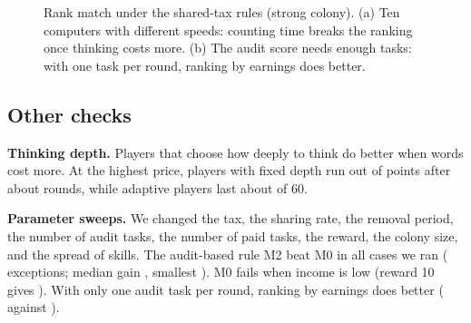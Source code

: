 \documentclass[conference]{IEEEtran}
\theoremstyle{plain}
\begin{document}
\begin{figure}[!t]
\centering
{}\hfill
{}
\caption{Rank match under the shared-tax rules (strong colony). (a) Ten computers with different speeds: counting time breaks the ranking once thinking costs more. (b) The audit score needs enough tasks: with one task per round, ranking by earnings does better.}
\label{fig:results}
\end{figure}

\subsection{Other checks}
\textbf{Thinking depth.} Players that choose how deeply to think do better when words cost more. At the highest price, players with fixed depth run out of points after about \NDepthFixedEight{} rounds, while adaptive players last about \NDepthAdaptiveEight{} of 60.

\textbf{Parameter sweeps.} We changed the tax, the sharing rate, the removal period, the number of audit tasks, the number of paid tasks, the reward, the colony size, and the spread of skills. The audit-based rule M2 beat M0 in all \NSweepCount{} cases we ran (\NSweepBelow{} exceptions; median gain \NSweepMedian{}, smallest \NSweepMin{}). M0 fails when income is low (reward 10 gives \NLowIncomeMzero{}). With only one audit task per round, ranking by earnings does better (\NProbesOneOne{} against \NProbesOneTwo{}).
\end{document}
